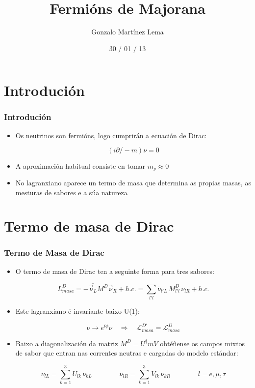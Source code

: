\documentclass[10pt]{beamer}
\title{Fermións de Majorana}
\author{Gonzalo Martínez Lema}
\date{30 / 01 / 13}
\newcommand{\beq}{\begin{equation}}
\newcommand{\eeq}{\end{equation}}
\newcommand{\bi}{\begin{itemize}}
\newcommand{\ei}{\end{itemize}}
\newcommand{\barra}[1]{\overline{#1}}
\newcommand{\h}[1]{#1^\dagger}
\newcommand{\rvec}[1]{\overrightarrow{#1}}
\newcommand{\chula}[1]{\mathcal{#1}}
\newcommand{\slx}[1]{ #1\!\!\!/ }
\begin{document}
\frame{\titlepage}


\begin{frame}%
\tableofcontents
\end{frame}

\section{Introdución}

\begin{frame} \frametitle{Introdución}
\bi

\item Os neutrinos son fermións, logo cumprirán a ecuación de Dirac:

\beq
(i \slx\partial - m) \nu = 0 \nonumber
\eeq

\item A aproximación habitual consiste en tomar $m_\nu \approx 0$

\item No lagranxiano aparece un termo de masa que determina as propias masas, as mesturas de sabores e a súa natureza

\ei
\end{frame}

\section{Termo de masa de Dirac}

\begin{frame} \frametitle{Termo de Masa de Dirac}
\bi

\item O termo de masa de Dirac ten a seguinte forma para tres sabores:

\beq
L_{masa}^D = -\barra{\rvec\nu_L} M^D \rvec\nu_R + h.c. = \sum_{l'l} \barra\nu_{l'L} \, M_{l'l}^D \, \nu_{lR}+h.c. \nonumber
\eeq

\item Este lagranxiano é invariante baixo U(1):

\beq
\nu \rightarrow e^{i\phi} \nu \quad \Rightarrow \quad \chula L_{masa}^{D'} = \chula L_{masa}^D \nonumber
\eeq

\item Baixo a diagonalización da matriz $M^D = \h U m V$ obtéñense os campos mixtos de sabor que entran nas correntes neutras e cargadas do modelo estándar:

\beq
\nu_{lL} = \sum_{k=1}^{3} U_{lk} \, \nu_{kL} \qquad\qquad \nu_{lR} = \sum_{k=1}^{3} V_{lk} \, \nu_{kR}
\qquad \qquad l = e, \mu, \tau \nonumber
\eeq

\ei

\end{frame}
\end{document}
